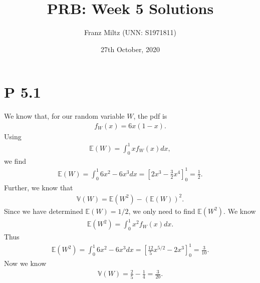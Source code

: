 \documentclass{article}
\newcommand{\E}{\mathbb{E}}
\newcommand{\V}{\mathbb{V}}
\begin{document}
\title{PRB: Week 5 Solutions}
\author{Franz Miltz (UNN: S1971811)}
\date{27th October, 2020}
\maketitle
\section*{P 5.1}
We know that, for our random variable $W$, the pdf is
\begin{align*}
  f_W(x) = 6x(1-x).
\end{align*}
Using
\begin{align*}
  \E(W) = \int_0^1 xf_W(x) dx,
\end{align*}
we find
\begin{align*}
  \E(W)=\int_0^1 6x^2-6x^3 dx = \left[2x^3 - \frac{3}{2}x^4\right]^1_0 = \frac{1}{2}.
\end{align*}
Further, we know that
\begin{align*}
  \V(W) = \E(W^2) - (\E(W))^2.
\end{align*}
Since we have determined $\E(W)=1/2$, we only need to find $\E(W^2)$. We know
\begin{align*}
  \E(W^2) = \int_0^1 x^2 f_{W}(x)dx.
\end{align*}
Thus
\begin{align*}
  \E(W^2) = \int_0^1 6 x^2 - 6x^3 dx = \left[\frac{12}{5}x^{5/2}-2x^3\right]_0^1=\frac{3}{10}.
\end{align*}
Now we know
\begin{align*}
  \V(W) = \frac{2}{5}-\frac{1}{4} = \frac{3}{20}.
\end{align*}
\end{document}
